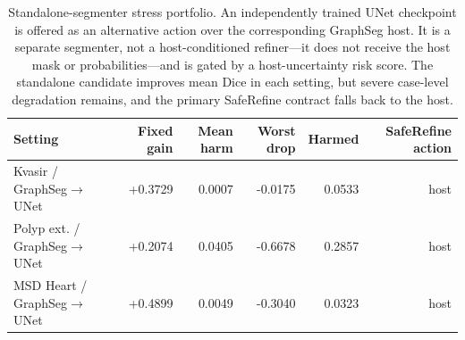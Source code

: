 \begin{table}[t]
\centering
\caption{Standalone-segmenter stress portfolio. An independently trained UNet checkpoint is offered as an alternative action over the corresponding GraphSeg host. It is a separate segmenter, not a host-conditioned refiner---it does not receive the host mask or probabilities---and is gated by a host-uncertainty risk score. The standalone candidate improves mean Dice in each setting, but severe case-level degradation remains, and the primary SafeRefine contract falls back to the host.}
\label{tab:learned_refiner_stress}
\begin{tabular}{lrrrrr}
\toprule
Setting & Fixed gain & Mean harm & Worst drop & Harmed & SafeRefine action \\
\midrule
Kvasir / GraphSeg$\rightarrow$UNet & +0.3729 & 0.0007 & -0.0175 & 0.0533 & host \\
Polyp ext. / GraphSeg$\rightarrow$UNet & +0.2074 & 0.0405 & -0.6678 & 0.2857 & host \\
MSD Heart / GraphSeg$\rightarrow$UNet & +0.4899 & 0.0049 & -0.3040 & 0.0323 & host \\
\bottomrule
\end{tabular}
\end{table}
